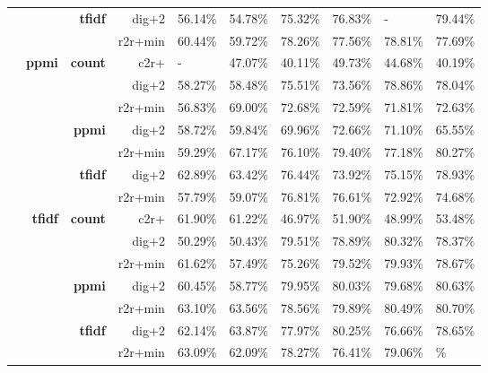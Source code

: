 \begin{table}
{\begin{tabular}{rrrrllllll}
	\cline{3-4}
	 &  & \multirow[t]{2}{*}{\textbf{tfidf}} & {dig+2} & 56.14\% & 54.78\% & 75.32\% & 76.83\% & - & 79.44\% \\
	 &  &  & {r2r+min} & 60.44\% & 59.72\% & 78.26\% & 77.56\% & 78.81\% & 77.69\% \\
	\cline{1-4} \cline{2-4} \cline{3-4}
	\multirow[t]{14}{*}{\textbf{\Smfauhtcsldp}} & \multirow[t]{7}{*}{\textbf{ppmi}} & \multirow[t]{3}{*}{\textbf{count}} & {c2r+} & - & 47.07\% & 40.11\% & 49.73\% & 44.68\% & 40.19\% \\
	 &  &  & {dig+2} & 58.27\% & 58.48\% & 75.51\% & 73.56\% & 78.86\% & 78.04\% \\
	 &  &  & {r2r+min} & 56.83\% & 69.00\% & 72.68\% & 72.59\% & 71.81\% & 72.63\% \\
	\cline{3-4}
	 &  & \multirow[t]{2}{*}{\textbf{ppmi}} & {dig+2} & 58.72\% & 59.84\% & 69.96\% & 72.66\% & 71.10\% & 65.55\% \\
	 &  &  & {r2r+min} & 59.29\% & 67.17\% & 76.10\% & 79.40\% & 77.18\% & 80.27\% \\
	\cline{3-4}
	 &  & \multirow[t]{2}{*}{\textbf{tfidf}} & {dig+2} & 62.89\% & 63.42\% & 76.44\% & 73.92\% & 75.15\% & 78.93\% \\
	 &  &  & {r2r+min} & 57.79\% & 59.07\% & 76.81\% & 76.61\% & 72.92\% & 74.68\% \\
	\cline{2-4} \cline{3-4}
	 & \multirow[t]{7}{*}{\textbf{tfidf}} & \multirow[t]{3}{*}{\textbf{count}} & {c2r+} & 61.90\% & 61.22\% & 46.97\% & 51.90\% & 48.99\% & 53.48\% \\
	 &  &  & {dig+2} & 50.29\% & 50.43\% & 79.51\% & 78.89\% & 80.32\% & 78.37\% \\
	 &  &  & {r2r+min} & 61.62\% & 57.49\% & 75.26\% & 79.52\% & 79.93\% & 78.67\% \\
	\cline{3-4}
	 &  & \multirow[t]{2}{*}{\textbf{ppmi}} & {dig+2} & 60.45\% & 58.77\% & 79.95\% & 80.03\% & 79.68\% & 80.63\% \\
	 &  &  & {r2r+min} & 63.10\% & 63.56\% & 78.56\% & 79.89\% & 80.49\% & 80.70\% \\
	\cline{3-4}
	 &  & \multirow[t]{2}{*}{\textbf{tfidf}} & {dig+2} & 62.14\% & 63.87\% & 77.97\% & 80.25\% & 76.66\% & 78.65\% \\
	 &  &  & {r2r+min} & 63.09\% & 62.09\% & 78.27\% & 76.41\% & 79.06\% & \bst 80.92\% \\
	\bottomrule
	\end{tabular}
	}
\end{table}



